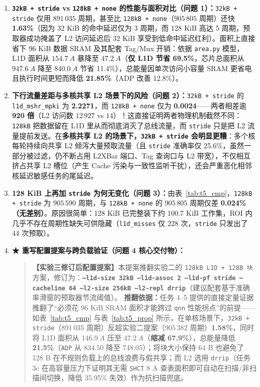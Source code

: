 \documentclass[12pt,a4paper,fontset=mac]{ctexart}
\begin{document}
\begin{enumerate}
  \item \textbf{\texttt{32kB + stride} vs \texttt{128kB + none} 的性能与面积对比（问题 1）：}\texttt{32kB + stride} 仅用 $891\,035$ 周期，甚至比 \texttt{128kB + none}（$905\,805$ 周期）还快 \textbf{1.63\%}（因为 32 KiB 的命中延迟仅为 3 周期，而 128 KiB 高达 5 周期，预取器成功掩盖了 L2 访问延迟后 32 KiB 享受到低命中延迟红利）。面积上直接省下 96 KiB 数据 SRAM 及其配套 Tag/Mux 开销：依据 \texttt{area.py} 模型，L1D 面积从 $154.7\ A$ 暴降至 $47.2\ A$（\textbf{仅 L1D 节省 69.5\%}，芯片总面积从 $947.6\ A$ 降至 $840.0\ A$ 节省 11.4\%），总能量因单次访问小容量 SRAM 更省电且执行时间更短而降低 \textbf{21.85\%}（ADP 改善 12.8\%）。
  \item \textbf{下行流量差距与多核共享 L2 场景下的风险（问题 2）：}\texttt{32kB + stride} 的 \texttt{l1d\_mshr\_mpki} 为 \textbf{2.2271}，而 \texttt{128kB + none} 仅为 \textbf{0.0024}——两者相差逾 \textbf{920 倍}（L2 访问数 $12\,927$ vs $14$）！这直接证明两者物理机制截然不同：\texttt{128kB} 把数据留在 L1D 里从而彻底消灭了总线流量，而 \texttt{stride} 只是把 L2 流量提前发送。在\textbf{多核共享 L2 的场景下，\texttt{32kB + stride} 会明显更糟}：多个核每轮持续向共享 L2 倾泻大量预取流量（且 \texttt{stride} 准确率仅 25.6\%，虽然一部分被过滤，仍不断占用 L2XBar 端口、Tag 查询口与 L2 带宽），不仅相互挤占共享 L2 槽位（产生 Cache 污染与一致性监听干扰），还会严重恶化相邻核延迟敏感任务的尾延迟。
  \item \textbf{128 KiB 上再加 \texttt{stride} 为何无变化（问题 3）：}由表~\ref{tab:t5_cmp}，\texttt{128kB + stride} 为 $905\,590$ 周期，与 \texttt{128kB + none} 的 $905\,805$ 周期仅差 \textbf{0.024\%（无差别）}。原因很简单：128 KiB 已完整装下约 100.7 KiB 工作集，ROI 内几乎不存在周期性缺失可供隐藏（\texttt{l1d\_misses} 仅 228 次，\texttt{stride} 只发出了 44 次预取）。
  \item \textbf{★ 重写配置提案与跨负载验证（问题 4 核心交付物）：}
  \begin{quote}
  \textbf{【实验三修订后配置提案】}本提案推翻实验二的 \texttt{128kB L1D + 128B 块} 方案，修订为：\textbf{\texttt{--l1d-size 32kB --l1d-assoc 2 --l1d-pf stride --cacheline 64 --l2-size 256kB --l2-repl drrip}}（建议配套基于准确率滑窗的预取器节流阈值）。
  \textbf{推翻依据：}任务 4--5 提供的直接定量证据推翻了“必须花 96 KiB SRAM 面积才能跨过 \texttt{qnn} 性能拐点”的前提——如表~\ref{tab:t5_cmp} 与表~\ref{tab:t5_prop} 所示，在单核场景下，\texttt{32kB + stride}（$891\,035$ 周期）反超实验二提案（$905\,382$ 周期）\textbf{1.58\%}，同时将 L1D 面积从 $146.9\ A$ 压至 $47.2\ A$（\textbf{缩减 67.9\%}），总能量降低 \textbf{21.5\%}（\texttt{ADP} 从 $834.50$ 降至 $748.05$）；将块大小保持 64 B 也避免了 128 B 在不规则负载上的总线浪费与假共享；而 L2 选用 \texttt{drrip}（任务 3c 在高容量压力下证明其无需 \texttt{SHCT} 8 A 查表面积即可自动在扫描/非扫描间切换，降低 35.95\% 失效）作为抗扫描兜底。

\end{quote}
\end{enumerate}
\end{document}
